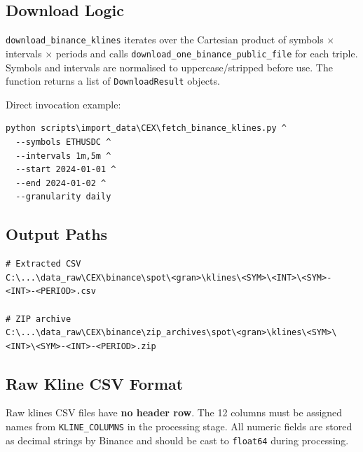 \documentclass[11pt,a4paper]{article}
\begin{document}
\subsection{Download Logic}

\texttt{download\_binance\_klines} iterates over the Cartesian product
of symbols $\times$ intervals $\times$ periods and calls
\texttt{download\_one\_binance\_public\_file} for each triple. Symbols
and intervals are normalised to uppercase/stripped before use.
The function returns a list of \texttt{DownloadResult} objects.

Direct invocation example:
\begin{lstlisting}
python scripts\import_data\CEX\fetch_binance_klines.py ^
  --symbols ETHUSDC ^
  --intervals 1m,5m ^
  --start 2024-01-01 ^
  --end 2024-01-02 ^
  --granularity daily
\end{lstlisting}

\subsection{Output Paths}

\begin{lstlisting}
# Extracted CSV
C:\...\data_raw\CEX\binance\spot\<gran>\klines\<SYM>\<INT>\<SYM>-<INT>-<PERIOD>.csv

# ZIP archive
C:\...\data_raw\CEX\binance\zip_archives\spot\<gran>\klines\<SYM>\<INT>\<SYM>-<INT>-<PERIOD>.zip
\end{lstlisting}

\subsection{Raw Kline CSV Format}

Raw klines CSV files have \textbf{no header row}. The 12 columns must
be assigned names from \texttt{KLINE\_COLUMNS} in the processing
stage. All numeric fields are stored as decimal strings by Binance
and should be cast to \texttt{float64} during processing.
\end{document}
